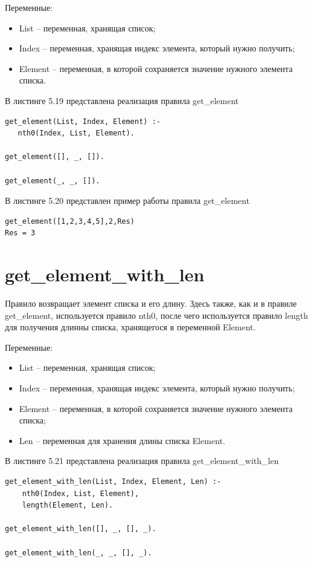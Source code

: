 \documentclass[12pt]{report}
\begin{document}
Переменные:
\begin{itemize}
\item List – переменная, хранящая список;
\item Index – переменная, хранящая индекс элемента, который нужно получить;
\item Element – переменная, в которой сохраняется значение нужного элемента списка.
\end{itemize}

В листинге 5.19 представлена реализация правила get\_element

\begin{lstlisting}[label=some-code, caption=реализация правила get\_element]
get_element(List, Index, Element) :-
   nth0(Index, List, Element).

get_element([], _, []).

get_element(_, _, []).

\end{lstlisting}
В листинге 5.20 представлен пример работы правила get\_element

\begin{lstlisting}[label=some-code, caption= пример работы  правила get\_element]
get_element([1,2,3,4,5],2,Res)
Res = 3
\end{lstlisting}
\section{get\_element\_with\_len}
Правило возвращает элемент списка и его длину. Здесь также, как и в правиле get\_element, используется правило nth0, после чего используется правило length для получения длинны списка, хранящегося в переменной Element.

Переменные:
\begin{itemize}
\item List – переменная, хранящая список;
\item Index – переменная, хранящая индекс элемента, который нужно получить;
\item Element – переменная, в которой сохраняется значение нужного элемента списка;
\item Len – переменная для хранения длины списка Element.
\end{itemize}

В листинге 5.21 представлена реализация правила get\_element\_with\_len

\begin{lstlisting}[label=some-code, caption=реализация правила get\_element\_with\_len]
get_element_with_len(List, Index, Element, Len) :-
	nth0(Index, List, Element),
	length(Element, Len).

get_element_with_len([], _, [], _).

get_element_with_len(_, _, [], _).

\end{lstlisting}
\end{document}
